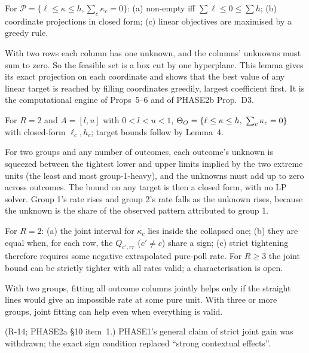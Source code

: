 \begin{result}
 For $\mathcal P=\{\ell\le\kappa\le h,\sum_c\kappa_c=0\}$:
(a) non-empty iff $\sum\ell\le0\le\sum h$; (b) coordinate projections in closed
form; (c) linear objectives are maximised by a greedy rule.
\end{result}
\begin{plain}
With two rows each column has one unknown, and the columns' unknowns must sum to
zero. So the feasible set is a box cut by one hyperplane. This lemma gives its
exact projection on each coordinate and shows that the best value of any linear
target is reached by filling coordinates greedily, largest coefficient first.
It is the computational engine of Props~5--6 and of PHASE2b Prop.~D3.
\end{plain}

\begin{result}
 For $R=2$ and $A=[l,u]$ with $0<l<u<1$, $\Theta_O=\{\ell\le\kappa\le
h,\ \sum_c\kappa_c=0\}$ with closed-form $\ell_c,h_c$; target bounds follow by
Lemma~4.
\end{result}
\begin{plain}
For two groups and any number of outcomes, each outcome's unknown is squeezed
between the tightest lower and upper limits implied by the two extreme units (the
least and most group-1-heavy), and the unknowns must add up to zero across
outcomes. The bound on any target is then a closed form, with no LP solver. Group
1's rate rises and group 2's rate falls as the unknown rises, because the unknown
is the share of the observed pattern attributed to group 1.
\end{plain}

\begin{result}
 For $R=2$: (a) the joint interval for $\kappa_c$ lies inside the
collapsed one; (b) they are equal when, for each row, the $Q_{c',rr}$ ($c'\ne c$)
share a sign; (c) strict tightening therefore requires some negative
extrapolated pure-poll rate. For $R\ge3$ the joint bound can be strictly tighter
with all rates valid; a characterisation is open.
\end{result}
\begin{plain}
With two groups, fitting all outcome columns jointly helps only if the straight
lines would give an impossible rate at some pure unit. With three or more groups,
joint fitting can help even when everything is valid.
\end{plain}
\begin{revnote}
(R-14; PHASE2a \S10 item~1.) PHASE1's general claim of strict joint gain was
withdrawn; the exact sign condition replaced ``strong contextual effects''.
\end{revnote}


